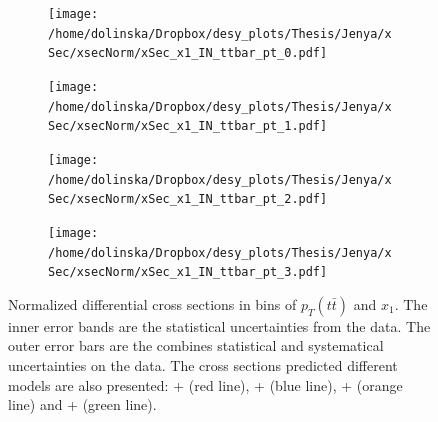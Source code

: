 \begin{figure}[p]
\centering
\begin{subfigure}
  \centering
  \texttt{[image: /home/dolinska/Dropbox/desy\_plots/Thesis/Jenya/xSec/xsecNorm/xSec\_x1\_IN\_ttbar\_pt\_0.pdf]}
\end{subfigure}
\begin{subfigure}
  \centering
  \texttt{[image: /home/dolinska/Dropbox/desy\_plots/Thesis/Jenya/xSec/xsecNorm/xSec\_x1\_IN\_ttbar\_pt\_1.pdf]}
\end{subfigure}
\begin{subfigure}
  \centering
  \texttt{[image: /home/dolinska/Dropbox/desy\_plots/Thesis/Jenya/xSec/xsecNorm/xSec\_x1\_IN\_ttbar\_pt\_2.pdf]}
\end{subfigure}
\begin{subfigure}
  \centering
  \texttt{[image: /home/dolinska/Dropbox/desy\_plots/Thesis/Jenya/xSec/xsecNorm/xSec\_x1\_IN\_ttbar\_pt\_3.pdf]}
\end{subfigure}
\caption{Normalized differential cross sections in bins of $p_{T}(t\bar{t})$ and  $x_{1}$. The inner error bands are the statistical uncertainties from the data.
         The outer error bars are the combines statistical and systematical uncertainties on the data. The cross sections predicted different models are also presented:
         \MG + \PYTHIA (red line), \Powheg + \PYTHIA (blue line), \Powheg + \HERWIG (orange line) and \MCNLO + \HERWIG (green line).}
\label{fig:XS_2D_x1_pttt1}
\end{figure}


